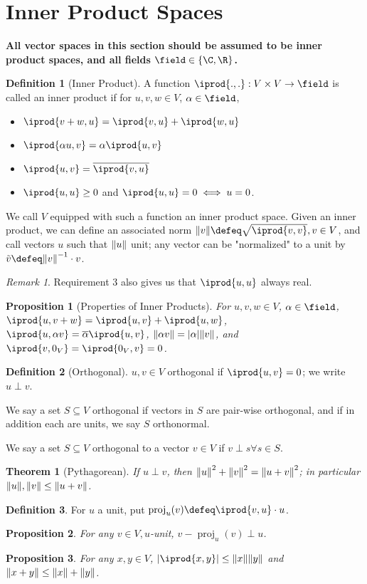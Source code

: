 \documentclass[12pt, oneside]{article}
\theoremstyle{definition}
\newtheorem{defn}{Definition}
\theoremstyle{plain}
\newtheorem{thm}{Theorem}
\newtheorem{prop}{Proposition}
\theoremstyle{remark}
\newtheorem{remark}{Remark}
\DeclareMathOperator{\proj}{proj}
\let\origsection=\section
\renewcommand\section[1]{\origsection{#1}\label{sec:\thesection}}
\begin{document}
\section{Inner Product Spaces}
\textbf{All vector spaces in this section should be assumed to be inner product spaces, and all fields $\field \in \{\C, \R\}$.}
\begin{defn}[Inner Product]
  A function $\iprod{.,.} : V \times V \to \field$ is called an inner product if for $u,v, w \in V$, $\alpha \in \field$, \begin{itemize}
    \item $\iprod{v + w, u} = \iprod{v, u} + \iprod{w, u}$
    \item $\iprod{\alpha u, v} = \alpha \iprod{u,v}$
    \item $\iprod{u, v} = \overline{\iprod{v, u}}$
    \item $\iprod{u, u} \geq 0$ and $\iprod{u, u} = 0 \iff u = 0$.
  \end{itemize}
  We call $V$ equipped with such a function an inner product space.
  Given an inner product, we can define an associated norm $\norm{v} \defeq \sqrt{\iprod{v, v}}, v \in V$, and call vectors $u$ such that $\norm{u}$ unit; any vector can be "normalized" to a unit by $\tilde{v} \defeq \norm{v}^{-1}\cdot v$.
\end{defn}

\begin{remark}
  Requirement 3 also gives us that $\iprod{u, u}$ always real.
\end{remark}

\begin{prop}[Properties of Inner Products]
  For $u, v, w \in V$, $\alpha \in \field$, $\iprod{u, v + w} = \iprod{u, v} + \iprod{u, w}$, $\iprod{u, \alpha v} = \overline{\alpha}\iprod{u, v}$, $\norm{\alpha v} = \abs{\alpha} \norm{v}$, and $\iprod{v, 0_V} = \iprod{0_V, v} = 0$.
\end{prop}

\begin{defn}[Orthogonal]
  $u, v \in V$ orthogonal if $\iprod{u,v} = 0$; we write $u \perp v$.

  We say a set $S \subseteq V$ orthogonal if vectors in $S$ are pair-wise orthogonal, and if in addition each are units, we say $S$ orthonormal.

  We say a set $S \subseteq V$ orthogonal to a vector $v \in V$ if $v \perp s \forall s \in S$.
\end{defn}
\begin{thm}[Pythagorean]
  If $u \perp v$, then $\norm{u}^2 + \norm{v}^2 = \norm{u+v}^2$; in particular $\norm{u}, \norm{v} \leq \norm{u + v}$.
\end{thm}
\begin{defn}
  For $u$ a unit, put $\proj_u(v) \defeq \iprod{v, u} \cdot u$.
\end{defn}
\begin{prop}
  For any $v \in V, u$-unit, $v - \proj_u(v) \perp u$.
\end{prop}
\begin{prop}
  For any $x, y \in V$, $\abs{\iprod{x, y}} \leq \norm{x}\norm{y}$ and $\norm{x + y} \leq \norm{x} + \norm{y}$.
\end{prop}
\end{document}
